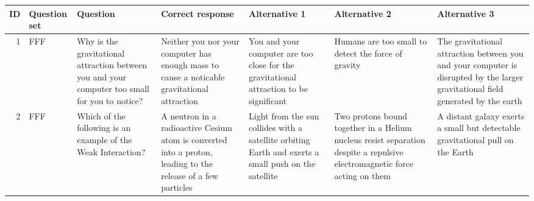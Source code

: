 \documentclass[10pt]{article}
\begin{document}
\begin{tiny}
\begin{longtable}{r|p{0.375in}|p{1.275in}|p{0.75in}|p{0.75in}|p{0.75in}|p{0.75in}}
    \textbf{ID} & \textbf{Question set} &                                                                                                                                                                                                                                                                         \textbf{Question} &                                                                                                                                     \textbf{Correct response} &                                                                                                     \textbf{Alternative 1} &                                                                                                                          \textbf{Alternative 2} &                                                                                                                                 \textbf{Alternative 3} \\\hline
    1     &     FFF &                                                                                                                                                                                   Why is the gravitational attraction between you and your computer too small for you to notice? &                                           Neither you nor your computer has enough mass to cause a noticable gravitational attraction &                You and your computer are too close for the gravitational attraction to be significant &                                                                        Humans are too small to detect the force of gravity &  The gravitational attraction between you and your computer is disrupted by the larger gravitational field generated by the earth \\\hline
    2     &     FFF &                                                                                                                                                                                                                    Which of the following is an example of the Weak Interaction? &                          A neutron in a radioactive Cesium atom is converted into a proton, leading to the release of a few particles &  Light from the sun collides with a satellite orbiting Earth and exerts a small push on the satellite &  Two protons bound together in a Helium nucleus resist separation despite a repulsive electromagnetic force acting on them &                                                   A distant galaxy exerts a small but detectable gravitational pull on the  Earth \\\hline

\end{longtable}
\end{tiny}
\end{document}
